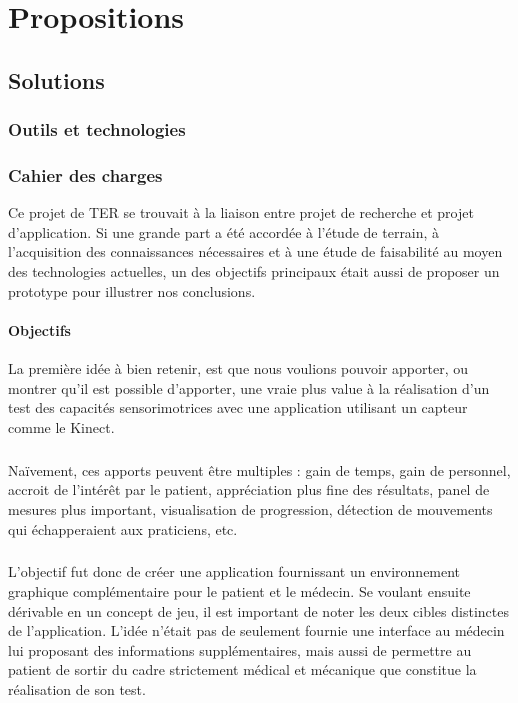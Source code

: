 \documentclass[french,12pt]{report}
\begin{document}
	\chapter{Propositions}
	
		\section{Solutions}
    \subsection{Outils et technologies} 
    
    
		\subsection{Cahier des charges}
Ce projet de TER se trouvait à la liaison entre projet de recherche et projet d'application. Si une grande part a été accordée à 
l'étude de terrain, à l'acquisition des connaissances nécessaires et à une étude de faisabilité au moyen des technologies actuelles, un des objectifs principaux était aussi de proposer un prototype pour illustrer nos conclusions.
		
\subsubsection{Objectifs}
La première idée à bien retenir, est que nous voulions pouvoir apporter, ou montrer qu'il est possible d'apporter, une vraie plus 
value à la réalisation d'un test des capacités sensorimotrices avec une application utilisant un capteur comme le Kinect.
\paragraph{}
Naïvement, ces apports peuvent être multiples : gain de temps, gain de personnel, accroit de l'intérêt par le patient, appréciation
plus fine des résultats, panel de mesures plus important, visualisation de progression, détection de mouvements qui
échapperaient aux praticiens, etc.

\paragraph{}
L'objectif fut donc de créer une application fournissant un environnement graphique complémentaire pour le patient et le médecin.
Se voulant ensuite dérivable en un concept de jeu, il est important de noter les deux cibles distinctes de l'application. L'idée 
n'était pas de seulement fournie une interface au médecin lui proposant des informations supplémentaires, mais aussi de
permettre au patient de sortir du cadre strictement médical et mécanique que constitue la réalisation de son test.
\end{document}
